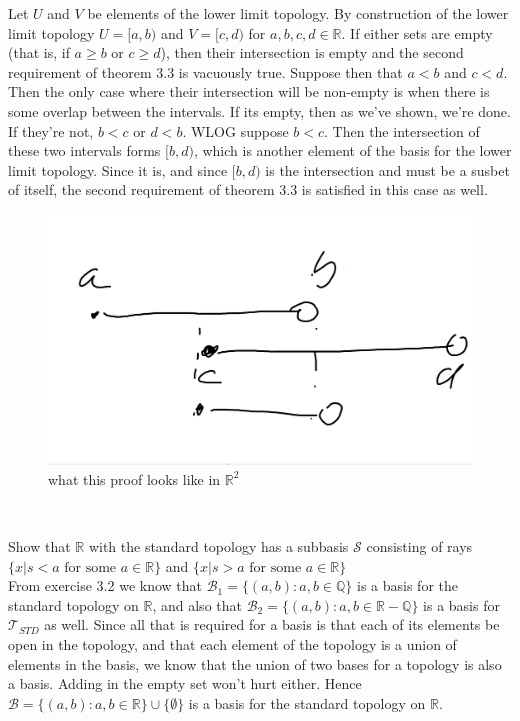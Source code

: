 \documentclass{article}
\newcommand{\Q}{\mathbb{Q}}
\newcommand{\R}{\mathbb{R}}
\newcommand{\standtop}{\mathcal{T}_{STD}}
\begin{document}
Let $U$ and $V$ be elements of the lower limit topology. By construction of the lower limit topology $U = [a,b)$ and $V = [c,d)$ for $a,b,c,d\in \R$. If either sets are empty (that is, if $a\ge b$ or $c\ge d$), then their intersection is empty and the second requirement of theorem 3.3 is vacuously true. Suppose then that $a < b$ and $c < d$. Then the only case where their intersection will be non-empty is when there is some overlap between the intervals. If its empty, then as we've shown, we're done. If they're not, $b < c$ or $d < b$. WLOG suppose $b < c$. Then the intersection of these two intervals forms $[b,d)$, which is another element of the basis for the lower limit topology. Since it is, and since $[b,d)$ is the intersection and must be a susbet of itself, the second requirement of theorem 3.3 is satisfied in this case as well.
\begin{figure}[htbp]
\centerline{\includegraphics[scale=0.5]{notebook/intervals.png}}
\caption{what this proof looks like in $\R^2$}
\label{fig}
\end{figure}
\\


\newpage

 Show that $\R$ with the standard topology has a subbasis $\mathcal{S}$ consisting of rays $\{x| s< a \mbox{ for some } a\in \R\}$ and $\{x| s> a \mbox{ for some } a\in \R\}$
\\

 From exercise 3.2 we know that $\mathcal{B}_1 = \{(a,b) : a,b\in \Q\}$ is a basis for the standard topology on $ \R$, and also that $\mathcal{B}_2= \{(a,b): a,b\in \R-\Q\}$ is a basis for $\standtop$ as well. Since all that is required for a basis is that each of its elements be open in the topology, and that each element of the topology is a union of elements in the basis, we know that the union of two bases for a topology is also a basis. Adding in the empty set won't hurt either. Hence $\mathcal{B} = \{(a,b) : a,b\in \R\}\cup\{\emptyset\}$ is a basis for the standard topology on $\R$.\\
\end{document}
